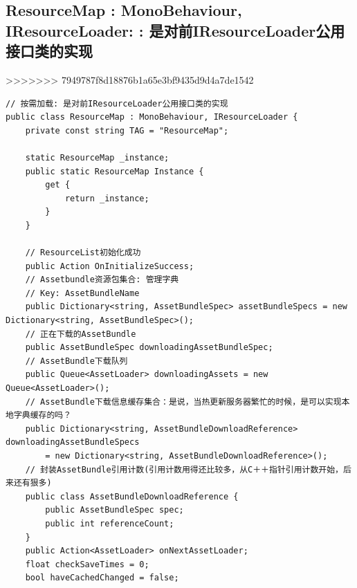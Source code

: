 \documentclass[9pt, b5paper]{article}
\begin{document}
\subsection{ResourceMap : MonoBehaviour, IResourceLoader: : 是对前IResourceLoader公用接口类的实现}
\label{sec-7-5}
>>>>>>> 7949787f8d18876b1a65e3bf9435d9d4a7de1542
\begin{verbatim}
// 按需加载: 是对前IResourceLoader公用接口类的实现
public class ResourceMap : MonoBehaviour, IResourceLoader {
    private const string TAG = "ResourceMap";
        
    static ResourceMap _instance;
    public static ResourceMap Instance {
        get {
            return _instance;
        }
    }

    // ResourceList初始化成功
    public Action OnInitializeSuccess;
    // Assetbundle资源包集合: 管理字典
    // Key: AssetBundleName
    public Dictionary<string, AssetBundleSpec> assetBundleSpecs = new Dictionary<string, AssetBundleSpec>();
    // 正在下载的AssetBundle
    public AssetBundleSpec downloadingAssetBundleSpec;
    // AssetBundle下载队列
    public Queue<AssetLoader> downloadingAssets = new Queue<AssetLoader>();
    // AssetBundle下载信息缓存集合：是说，当热更新服务器繁忙的时候，是可以实现本地字典缓存的吗？
    public Dictionary<string, AssetBundleDownloadReference> downloadingAssetBundleSpecs
        = new Dictionary<string, AssetBundleDownloadReference>();
    // 封装AssetBundle引用计数(引用计数用得还比较多，从C＋＋指针引用计数开始，后来还有狠多)
    public class AssetBundleDownloadReference {
        public AssetBundleSpec spec;
        public int referenceCount;
    }
    public Action<AssetLoader> onNextAssetLoader;
    float checkSaveTimes = 0;
    bool haveCachedChanged = false;


\end{verbatim}
\end{document}
